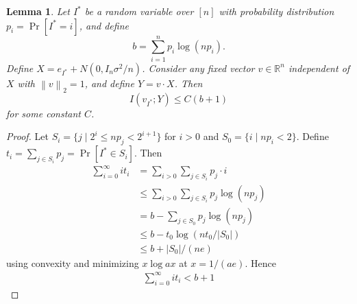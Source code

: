 \documentclass[twoside,leqno,twocolumn]{article}
\newtheorem{lemma}[theorem]{Lemma}
\newcommand{\abs}[1]{\left|#1\right|}
\newcommand{\norm}[2]{\left \lVert#2\right \rVert_{#1}}
\def\R{\mathbb{R}}
\begin{document}
\begin{lemma}\label{lemma:oneround}
  Let $I^*$ be a random variable over $[n]$ with probability
  distribution $p_i = \Pr[I^*=i]$, and define
  \[
  b = \sum_{i=1}^n p_i \log (n p_i).
  \]
  Define $X = e_{I^*} + N(0, I_n\sigma^2/n)$.  Consider any fixed
  vector $v \in \R^n$ independent of $X$ with $\norm{2}{v} = 1$, and
  define $Y = v \cdot X$.  Then
  \[
  I(v_{I^*}; Y) \leq C(b + 1)
  \]
  for some constant $C$.
\end{lemma}
\begin{proof}
  Let $S_i = \{j \mid 2^{i} \leq np_j < 2^{i+1}\}$ for $i > 0$ and
  $S_{0} = \{i \mid np_i < 2\}$.  Define $t_i = \sum_{j \in S_i} p_j =
  \Pr[I^* \in S_i]$.  Then
  \begin{align*}
    \sum_{i=0}^{\infty} i t_i &= \sum_{i > 0} \sum_{j \in S_i} p_j \cdot i\\
    &\leq \sum_{i > 0} \sum_{j \in S_i} p_j\log (np_j)\\
    &= b - \sum_{j \in S_{0}} p_j \log (np_j)\\
    &\leq b - t_{0} \log (n t_{0} / \abs{S_{0}})\\
    &\leq b + \abs{S_{0}} / (ne)
  \end{align*}
  using convexity and minimizing $x \log ax$ at $x = 1/(ae)$.  Hence
  \begin{align}\label{eq:it_i}
    \sum_{i=0}^{\infty} i t_i < b + 1
  \end{align}


\end{proof}
\end{document}
